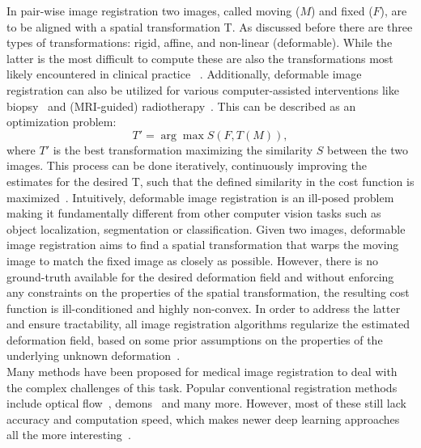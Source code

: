 \documentclass[english,version-2022-01]{uzl-thesis} %
\begin{document}
In pair-wise image registration two images, called moving ($M$) and fixed ($F$), are to be aligned with a spatial transformation T. As discussed before there are three types of transformations: rigid, affine, and non-linear (deformable). While the latter is the most difficult to compute these are also the transformations most likely encountered in clinical practice
~\cite{Zou2022}. Additionally, deformable image registration can also be
utilized for various computer-assisted interventions like biopsy~\cite{Tam2016} and (MRI-guided) radiotherapy~\cite{Chen2017, Rigaud2019}. This can be described as an optimization problem:
\begin{equation}
	T' = \arg\max S(F, T(M)),
\end{equation}
where $T'$ is the best transformation maximizing the similarity $S$ between the two images. This process can be done iteratively, continuously improving the estimates for the desired T, such that the defined similarity in the cost function is maximized~\cite{Chen2020}. Intuitively, deformable image registration is an ill-posed problem making it fundamentally different from other computer vision tasks such as object localization, segmentation or classification. Given two images, deformable image registration aims to find a spatial transformation that warps the moving image to match the fixed image as closely as possible. However, there is no ground-truth available for the desired deformation field and without enforcing any constraints on the properties of the spatial transformation, the resulting cost function is ill-conditioned and highly non-convex. In order to address the latter and ensure tractability, all image registration algorithms regularize the estimated deformation field, based on some prior assumptions on the properties of the underlying unknown deformation~\cite{Chen2020}.\\
Many methods have been proposed for medical image registration to deal with the complex challenges of this task. Popular conventional registration methods include optical flow~\cite{Yang2008}, demons~\cite{Vercauteren2009} and many more. However, most of these still lack accuracy and computation speed, which makes newer deep learning approaches all the more interesting~\cite{Fu2020}.
\end{document}
